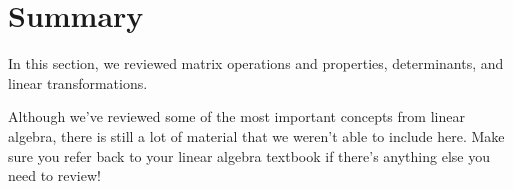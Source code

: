 \documentclass{ximera}
\begin{document}
\section*{Summary}

In this section, we reviewed matrix operations and properties, determinants, and linear transformations.

Although we've reviewed some of the most important concepts from linear algebra, there is still a lot of material that we weren't able to include here. Make sure you refer back to your linear algebra textbook if there's anything else you need to review!
\end{document}
